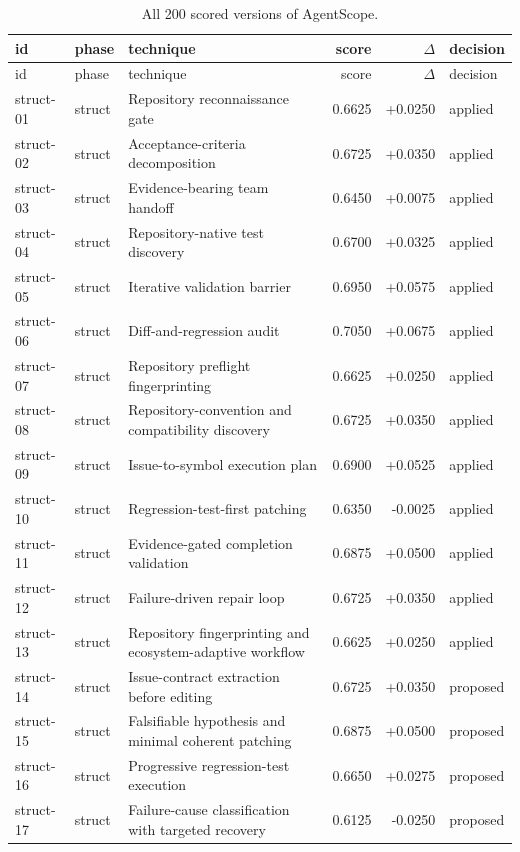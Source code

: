 \begin{center}\scriptsize\begin{longtable}{llp{5.2cm}rrl}
\caption{All 200 scored versions of AgentScope.}\\
\toprule id & phase & technique & score & $\Delta$ & decision \\ \midrule \endfirsthead
\toprule id & phase & technique & score & $\Delta$ & decision \\ \midrule \endhead
struct-01 & struct & Repository reconnaissance gate & 0.6625 & +0.0250 & applied \\
struct-02 & struct & Acceptance-criteria decomposition & 0.6725 & +0.0350 & applied \\
struct-03 & struct & Evidence-bearing team handoff & 0.6450 & +0.0075 & applied \\
struct-04 & struct & Repository-native test discovery & 0.6700 & +0.0325 & applied \\
struct-05 & struct & Iterative validation barrier & 0.6950 & +0.0575 & applied \\
struct-06 & struct & Diff-and-regression audit & 0.7050 & +0.0675 & applied \\
struct-07 & struct & Repository preflight fingerprinting & 0.6625 & +0.0250 & applied \\
struct-08 & struct & Repository-convention and compatibility discovery & 0.6725 & +0.0350 & applied \\
struct-09 & struct & Issue-to-symbol execution plan & 0.6900 & +0.0525 & applied \\
struct-10 & struct & Regression-test-first patching & 0.6350 & -0.0025 & applied \\
struct-11 & struct & Evidence-gated completion validation & 0.6875 & +0.0500 & applied \\
struct-12 & struct & Failure-driven repair loop & 0.6725 & +0.0350 & applied \\
struct-13 & struct & Repository fingerprinting and ecosystem-adaptive workflow & 0.6625 & +0.0250 & applied \\
struct-14 & struct & Issue-contract extraction before editing & 0.6725 & +0.0350 & proposed \\
struct-15 & struct & Falsifiable hypothesis and minimal coherent patching & 0.6875 & +0.0500 & proposed \\
struct-16 & struct & Progressive regression-test execution & 0.6650 & +0.0275 & proposed \\
struct-17 & struct & Failure-cause classification with targeted recovery & 0.6125 & -0.0250 & proposed \\

\end{longtable}
\end{center}
